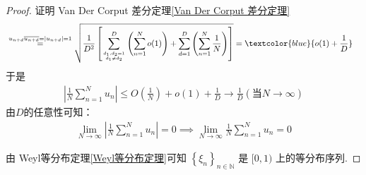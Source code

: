 \begin{proof}{证明 Van Der Corput 差分定理\cref{Van Der Corput 差分定理}}
\begin{align*}
                                                                     & \overset{u_{n+d}\overline{u_{n+d}}=\left|u_{n+d}\right|=1}{=}\sqrt{\frac{1}{D^2}\left[ \sum_{{d_1,d_2=1 \atop {d_1\ne d_2}}}^D{\left( \sum_{n=1}^N{o(1)} \right)}+\sum_{d=1}^D{\left( \sum_{n=1}^N{\frac{1}{N}} \right)} \right]}=\textcolor{blue}{o(1)+\frac{1}{D}}
    \end{align*}
    于是
    \begin{align}
        \left|\frac{1}{N} \sum_{n=1}^N u_n\right|\le O(\frac{1}{N})+o(1)+\frac{1}{D}\longrightarrow \frac{1}{D}(\text{当}N\to \infty)
    \end{align}
    由$D$的任意性可知：
    \begin{align}
        \lim _{N \rightarrow \infty}\left|\frac{1}{N} \sum_{n=1}^N u_n\right|=0
        \implies \lim _{N \rightarrow \infty} \frac{1}{N} \sum_{n=1}^N u_n=0
    \end{align}


    由 Weyl等分布定理\cref{Weyl等分布定理}可知 $\left\{\xi_n\right\}_{n \in \mathbb{N}}$ 是 $[0,1)$ 上的等分布序列.

\end{proof}

